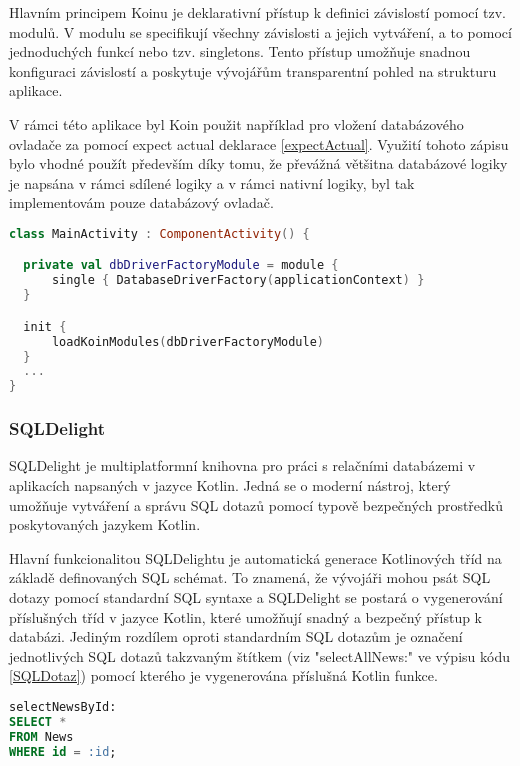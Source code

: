 Hlavním principem Koinu je deklarativní přístup k definici závislostí pomocí tzv. modulů. V modulu se specifikují všechny závislosti a 
jejich vytváření, a to pomocí jednoduchých funkcí nebo tzv. singletons. Tento přístup umožňuje snadnou konfiguraci závislostí a poskytuje
 vývojářům transparentní pohled na strukturu aplikace.

\bigskip

V rámci této aplikace byl Koin použit například pro vložení databázového ovladače za pomocí expect actual deklarace \ref{expectActual}.
Využití tohoto zápisu bylo vhodné použít především díky tomu, že převážná většitna databázové logiky je napsána v rámci sdílené 
logiky a v rámci nativní logiky, byl tak implementovám pouze databázový ovladač.

\begin{lstlisting}[caption={DI databázového ovladače pomocí Koinu}, label={lst:KoinInit}, language=Kotlin]
class MainActivity : ComponentActivity() {

  private val dbDriverFactoryModule = module {
      single { DatabaseDriverFactory(applicationContext) }
  }

  init {
      loadKoinModules(dbDriverFactoryModule)
  }
  ...
}
\end{lstlisting}

\subsubsection*{SQLDelight}
SQLDelight je multiplatformní knihovna pro práci s relačními databázemi v aplikacích napsaných v jazyce Kotlin. Jedná se o moderní nástroj, 
který umožňuje vytváření a správu SQL dotazů pomocí typově bezpečných prostředků poskytovaných jazykem Kotlin.

Hlavní funkcionalitou SQLDelightu je automatická generace Kotlinových tříd na základě definovaných SQL schémat. To znamená, že vývojáři
 mohou psát SQL dotazy pomocí standardní SQL syntaxe a SQLDelight se postará o vygenerování příslušných tříd v jazyce Kotlin, které umožňují 
 snadný a bezpečný přístup k databázi. Jediným rozdílem oproti standardním SQL dotazům je označení jednotlivých SQL dotazů takzvaným 
 štítkem (viz "selectAllNews:" ve výpisu kódu \ref{SQLDotaz}) pomocí kterého je vygenerována příslušná Kotlin funkce. 

\begin{lstlisting}[caption={SQL dotaz}, label={lst:SQLDotaz}, language=SQL]
selectNewsById:
SELECT *
FROM News
WHERE id = :id;
\end{lstlisting}

